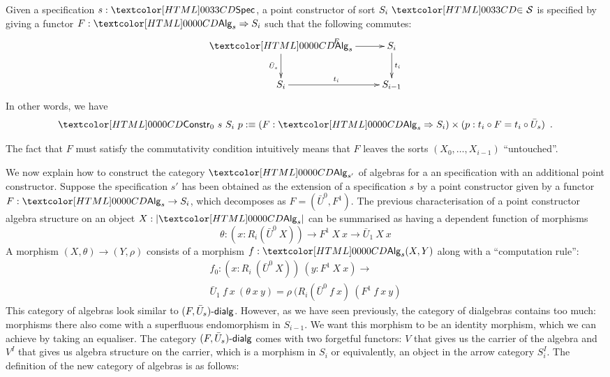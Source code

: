 \begin{definition}
  Given a specification $s : \specty$, a point constructor of sort
  $\sortsin{S_i}{\Ss}$ is specified by giving a functor
  $F : \Func{\Alg_s}{S_i}$ such that the following commutes:
  $$
  \xymatrix{
    \Alg_s \ar[r]^{F} \ar[d]_{\bar{U}_s} &S_i \ar[d]^{t_i} \\
    S_i \ar[r]^{t_i} &S_{i-1}
  }
  $$
  In other words, we have
  $$
  \Constr_0\ s\ S_i\ p \ddefeq (F : \Func{\Alg_s}{S_i}) \times (p : t_i \circ F = t_i \circ \bar{U}_s) \enspace .
  $$
\end{definition} 

The fact that $F$ must satisfy the commutativity condition intuitively
means that $F$ leaves the sorts $(X_0, \hdots, X_{i-1})$ ``untouched''.

We now explain how to construct the category $\Alg_{s'}$ of algebras
for a an specification with an additional point constructor. Suppose
the specification $s'$ has been obtained as the extension of a
specification $s$ by a point constructor given by a functor
$F : \Alg_s \to S_i$, which decomposes as $F = (\bar{U}^0, F^1)$. The
previous characterisation of a point constructor algebra structure on
an object $X : | \Alg_s |$ can be summarised as having a dependent
function of morphisms
\[
\theta : (x : R_i (\bar{U}^0\ X)) \to F^1\ X\ x \to \bar{U}_1\ X\ x
\]
A morphism $(X,\theta) \to (Y,\rho)$ consists of a morphism
$f : \Alg_s(X,Y)$ along with a ``computation rule'':
\begin{multline*}
f_0 : (x : R_i \ (\bar{U}^0\ X))\ (y : F^1\ X\ x) \to \\ 
\bar{U}_1\ f\ x\ (\theta\ x\ y) = \rho\ (R_i(\bar{U}^0\ f\ x)\ (F^1\ f\ x\ y)
\end{multline*}
This category of algebras look similar to
$\dialgcat{F}{\bar{U}_s}$. However, as we have seen previously, the
category of dialgebras contains too much: morphisms there also come
with a superfluous endomorphism in $S_{i-1}$. We want this morphism to
be an identity morphism, which we can achieve by taking an
equaliser. The category $\dialgcat{F}{\bar{U}_s}$ comes with two
forgetful functors: $V$ that gives us the carrier of the algebra and
$V^I$ that gives us algebra structure on the carrier, which is a
morphism in $S_i$ or equivalently, an object in the arrow category
$S_i^I$. The definition of the new category of algebras is as follows:

